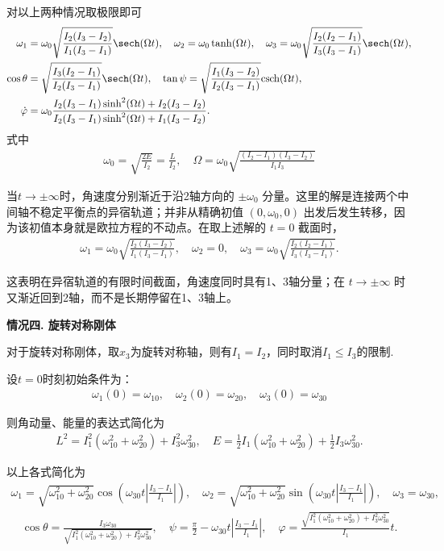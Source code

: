对以上两种情况取极限即可
\begin{align*}
	\omega_1      & = \omega_0\sqrt{\frac{I_2(I_3-I_2)}{I_1(I_3-I_1)}}\sech(\Omega t) ,\quad
	\omega_2 = \omega_0\tanh(\Omega t) ,\quad
	\omega_3 = \omega_0\sqrt{\frac{I_2(I_2-I_1)}{I_3(I_3-I_1)}}\sech(\Omega t),                                              \\
	\cos\theta    & = \sqrt{\frac{I_3(I_2-I_1)}{I_2(I_3-I_1)}}\sech(\Omega t) ,\quad
	\tan\psi = \sqrt{\frac{I_1(I_3-I_2)}{I_2(I_3-I_1)}}\mathrm{csch}(\Omega t) ,                                             \\
	\dot{\varphi} & = \omega_0\frac{I_2(I_3-I_1)\sinh^2(\Omega t)+I_2(I_3-I_2)}{I_2(I_3-I_1)\sinh^2(\Omega t)+I_1(I_3-I_2)}.
\end{align*}
式中
\begin{align*}
	\omega_0 = \sqrt{\frac{2E}{I_2}} = \frac{L}{I_2},\quad \Omega = \omega_0\sqrt{\frac{(I_2-I_1)(I_3-I_2)}{I_1I_3}}
\end{align*}

当\(t \to \pm\infty\)时，角速度分别渐近于沿2轴方向的 \(\pm\omega_0\) 分量。这里的解是连接两个中间轴不稳定平衡点的异宿轨道；并非从精确初值 \((0,\omega_0,0)\) 出发后发生转移，因为该初值本身就是欧拉方程的不动点。在取上述解的 \(t=0\) 截面时，
\begin{align*}
	\omega_1= \omega_0 \sqrt{\frac{I_2(I_3-I_2)}{I_1(I_3-I_1)}} ,\quad
	\omega_2 = 0 ,\quad
	\omega_3 = \omega_0 \sqrt{\frac{I_2(I_2-I_1)}{I_3(I_3-I_1)}}.
\end{align*}

这表明在异宿轨道的有限时间截面，角速度同时具有1、3轴分量；在 \(t\to\pm\infty\) 时又渐近回到2轴，而不是长期停留在1、3轴上。

\textbf{情况四. 旋转对称刚体}

对于旋转对称刚体，取\(x_3\)为旋转对称轴，则有\(I_1 = I_2\)，同时取消\(I_1 \leq I_3\)的限制.

设\(t=0\)时刻初始条件为：
\begin{align*}
	\omega_1(0) = \omega_{10}, \quad \omega_2(0) = \omega_{20}, \quad \omega_3(0) = \omega_{30}
\end{align*}

则角动量、能量的表达式简化为
\begin{align*}
	L^2 = I_1^2(\omega_{10}^2 + \omega_{20}^2) + I_3^2\omega_{30}^2 ,\quad
	E = \frac{1}{2}I_1(\omega_{10}^2 + \omega_{20}^2) + \frac{1}{2}I_3\omega_{30}^2.
\end{align*}

以上各式简化为
\begin{align*}
	\omega_1 = \sqrt{\omega_{10}^2+\omega_{20}^2}\cos\left(\omega_{30}t\left|\frac{I_3-I_1}{I_1}\right|\right) ,\quad
	\omega_2 = \sqrt{\omega_{10}^2+\omega_{20}^2}\sin\left(\omega_{30}t\left|\frac{I_3-I_1}{I_1}\right|\right) ,\quad
	\omega_3 = \omega_{30} ,
\end{align*}
\begin{align*}
	\cos\theta = \frac{I_3\omega_{30}}{\sqrt{I_1^2(\omega_{10}^2+\omega_{20}^2)+I_3^2\omega_{30}^2}} ,\quad
	\psi = \frac{\pi}{2}-\omega_{30}t\left|\frac{I_3-I_1}{I_1}\right| ,\quad
	\varphi = \frac{\sqrt{I_1^2(\omega_{10}^2+\omega_{20}^2)+I_3^2\omega_{30}^2}}{I_1}t.
\end{align*}

